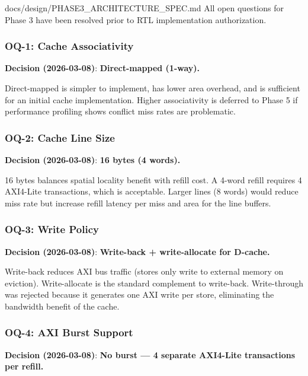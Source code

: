 \begin{relocated}{docs/design/PHASE3_ARCHITECTURE_SPEC.md}
All open questions for Phase 3 have been resolved prior to RTL
implementation authorization.

\subsubsection{OQ-1: Cache Associativity}\label{ds:ch:phase3-architecture:oq-1-cache-associativity}

\textbf{Decision (2026-03-08)}: \ok{} \textbf{Direct-mapped (1-way).}

Direct-mapped is simpler to implement, has lower area overhead, and is
sufficient for an initial cache implementation. Higher associativity is
deferred to Phase 5 if performance profiling shows conflict miss rates
are problematic.

\subsubsection{OQ-2: Cache Line Size}\label{ds:ch:phase3-architecture:oq-2-cache-line-size}

\textbf{Decision (2026-03-08)}: \ok{} \textbf{16 bytes (4 words).}

16 bytes balances spatial locality benefit with refill cost. A 4-word
refill requires 4 AXI4-Lite transactions, which is acceptable. Larger
lines (8 words) would reduce miss rate but increase refill latency per
miss and area for the line buffers.

\subsubsection{OQ-3: Write Policy}\label{ds:ch:phase3-architecture:oq-3-write-policy}

\textbf{Decision (2026-03-08)}: \ok{} \textbf{Write-back +
write-allocate for D-cache.}

Write-back reduces AXI bus traffic (stores only write to external memory
on eviction). Write-allocate is the standard complement to write-back.
Write-through was rejected because it generates one AXI write per store,
eliminating the bandwidth benefit of the cache.

\subsubsection{OQ-4: AXI Burst Support}\label{ds:ch:phase3-architecture:oq-4-axi-burst-support}

\textbf{Decision (2026-03-08)}: \ok{} \textbf{No burst --- 4 separate
AXI4-Lite transactions per refill.}


\end{relocated}
